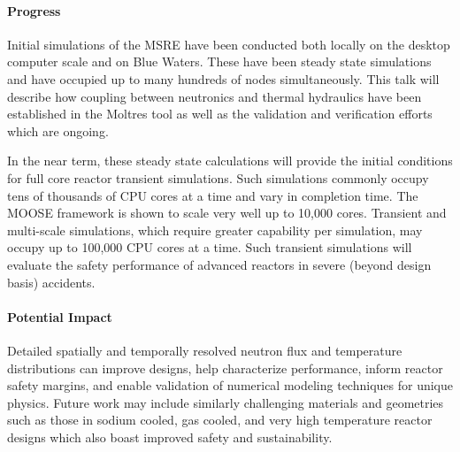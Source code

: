 \documentclass[11pt]{article}
\begin{document}
\paragraph{Progress}

Initial simulations of the MSRE have been conducted both locally on the desktop
computer scale and on Blue Waters. These have been steady state simulations and
have occupied up to many hundreds of nodes simultaneously. This talk will
describe how coupling between neutronics and thermal hydraulics have been
established in the Moltres tool as well as the validation and verification
efforts which are ongoing.

In the near term, these steady state calculations will provide the initial
conditions for full core reactor transient simulations. Such simulations
commonly occupy tens of thousands of CPU cores at a time and vary in completion
time. The MOOSE framework is shown to scale very well up to 10,000 cores.
Transient and multi-scale simulations, which require greater capability per
simulation, may occupy up to 100,000 CPU cores at a time. Such transient
simulations will evaluate the safety performance of advanced reactors in severe
(beyond design basis) accidents.

\paragraph{Potential Impact}
Detailed spatially and temporally resolved neutron flux and
temperature distributions can improve designs, help characterize
performance, inform reactor safety margins, and enable validation of numerical
modeling techniques for unique physics.
Future work may include similarly challenging materials and geometries such as
those in sodium cooled, gas cooled, and very high temperature reactor designs
which also boast improved safety and sustainability.
\end{document}
